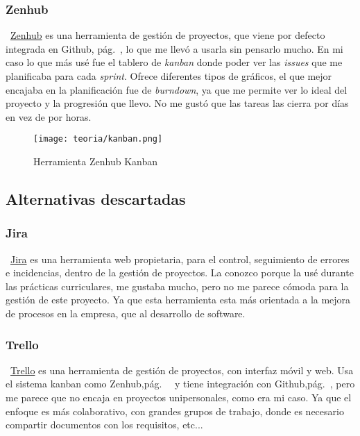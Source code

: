 \subsubsection{Zenhub}\label{zenhub}
~\href{https://bitbucket.org/product//}{Zenhub} es una herramienta de gestión de proyectos, que viene por defecto integrada en Github, pág.~\pageref{github}, lo que me llevó a usarla sin pensarlo mucho. En mi caso lo que más usé fue el tablero de \emph{kanban} donde poder ver las \emph{issues} que me planificaba para cada \emph{sprint}. Ofrece diferentes tipos de gráficos, el que mejor encajaba en la planificación fue de \emph{burndown}, ya que me permite ver lo ideal del proyecto y la progresión que llevo. No me gustó que las tareas las cierra por días en vez de por horas.

\begin{figure}[h]
	\centering
	\texttt{[image: teoria/kanban.png]}
	\caption{Herramienta Zenhub Kanban}\label{fig:zenhub}
\end{figure}

\subsection{Alternativas descartadas}

\subsubsection{Jira}
~\href{https://www.atlassian.com/es/software/jira}{Jira} es una herramienta web propietaria, para el control, seguimiento de errores e incidencias, dentro de la gestión de proyectos. La conozco porque la usé durante las prácticas curriculares, me gustaba mucho, pero no me parece cómoda para la gestión de este proyecto. Ya que esta herramienta esta más orientada a la mejora de procesos en la empresa, que al desarrollo de software.

\subsubsection{Trello}
~\href{https://trello.com/es}{Trello} es una herramienta de gestión de proyectos, con interfaz móvil y web. Usa el sistema kanban como Zenhub,pág.~~\pageref{zenhub} y tiene integración con Github,pág.~\pageref{github}, pero me parece que no encaja en proyectos unipersonales, como era mi caso. Ya que el enfoque es más colaborativo, con grandes grupos de trabajo, donde es necesario compartir documentos con los requisitos, etc...

